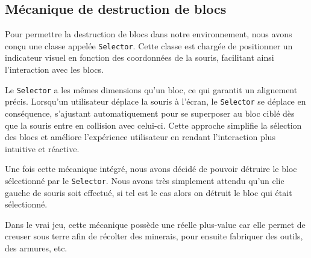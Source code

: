 \documentclass[12pt]{article}
\begin{document}
\subsection{Mécanique de destruction de blocs}

Pour permettre la destruction de blocs dans notre environnement, nous avons conçu une classe appelée \texttt{Selector}. Cette classe est chargée de positionner un indicateur visuel en fonction des coordonnées de la souris, facilitant ainsi l’interaction avec les blocs.

Le \texttt{Selector} a les mêmes dimensions qu’un bloc, ce qui garantit un alignement précis. Lorsqu’un utilisateur déplace la souris à l’écran, le \texttt{Selector} se déplace en conséquence, s’ajustant automatiquement pour se superposer au bloc ciblé dès que la souris entre en collision avec celui-ci. Cette approche simplifie la sélection des blocs et améliore l’expérience utilisateur en rendant l’interaction plus intuitive et réactive.\par
Une fois cette mécanique intégré, nous avons décidé de pouvoir détruire le bloc sélectionné par le \texttt{Selector}. Nous avons très simplement attendu qu'un clic gauche de souris soit effectué, si tel est le cas alors on détruit le bloc qui était sélectionné.\par
Dans le vrai jeu, cette mécanique possède une réelle plus-value car elle permet de creuser sous terre afin de récolter des minerais, pour ensuite fabriquer des outils, des armures, etc.


\vspace{1cm}
\end{document}

